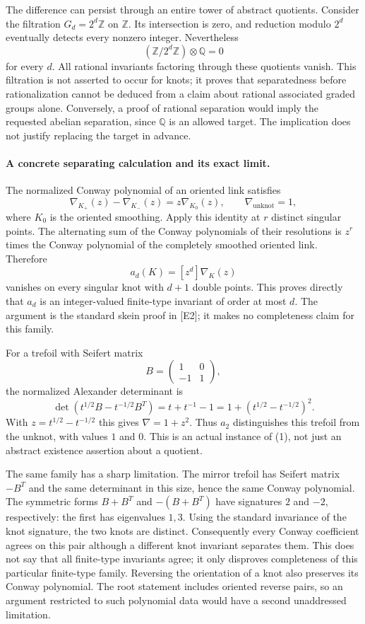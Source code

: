 \documentclass[11pt]{article}
\begin{document}
The difference can persist through an entire tower of abstract
quotients. Consider the filtration $G_d=2^d\mathbb Z$ on $\mathbb Z$.
Its intersection is zero, and reduction modulo $2^d$ eventually detects
every nonzero integer. Nevertheless
\[
              (\mathbb Z/2^d\mathbb Z)\otimes\mathbb Q=0
\]
for every $d$. All rational invariants factoring through these
quotients vanish. This filtration is not asserted to occur for knots;
it proves that separatedness before rationalization cannot be deduced
from a claim about rational associated graded groups alone. Conversely,
a proof of rational separation would imply the requested abelian
separation, since $\mathbb Q$ is an allowed target. The implication does
not justify replacing the target in advance.

\paragraph{A concrete separating calculation and its exact limit.}
The normalized Conway polynomial of an oriented link satisfies
\[
       \nabla_{K_+}(z)-\nabla_{K_-}(z)=z\nabla_{K_0}(z),
       \qquad \nabla_{\text{unknot}}=1,
\]
where $K_0$ is the oriented smoothing. Apply this identity at $r$
distinct singular points. The alternating sum of the Conway
polynomials of their resolutions is $z^r$ times the Conway polynomial
of the completely smoothed oriented link. Therefore
\[
                  a_d(K)=[z^d]\nabla_K(z)
\]
vanishes on every singular knot with $d+1$ double points. This proves
directly that $a_d$ is an integer-valued finite-type invariant of order
at most $d$. The argument is the standard skein proof in [E2]; it makes
no completeness claim for this family.

For a trefoil with Seifert matrix
\[
                  B=\begin{pmatrix}1&0\\-1&1\end{pmatrix},
\]
the normalized Alexander determinant is
\[
 \det(t^{1/2}B-t^{-1/2}B^T)
       =t+t^{-1}-1=1+(t^{1/2}-t^{-1/2})^2.
\]
With $z=t^{1/2}-t^{-1/2}$ this gives $\nabla=1+z^2$.
Thus $a_2$ distinguishes this trefoil from the unknot, with values $1$
and $0$. This is an actual instance of (1), not just an abstract
existence assertion about a quotient.

The same family has a sharp limitation. The mirror trefoil has Seifert
matrix $-B^T$ and the same determinant in this size, hence the same
Conway polynomial. The symmetric forms $B+B^T$ and $-(B+B^T)$ have
signatures $2$ and $-2$, respectively: the first has eigenvalues $1,3$.
Using the standard invariance of the knot signature, the two knots are
distinct. Consequently every Conway coefficient agrees on this pair
although a different knot invariant separates them. This does not say
that all finite-type invariants agree; it only disproves completeness
of this particular finite-type family. Reversing the orientation of a
knot also preserves its Conway polynomial. The root statement includes
oriented reverse pairs, so an argument restricted to such polynomial
data would have a second unaddressed limitation.
\end{document}
